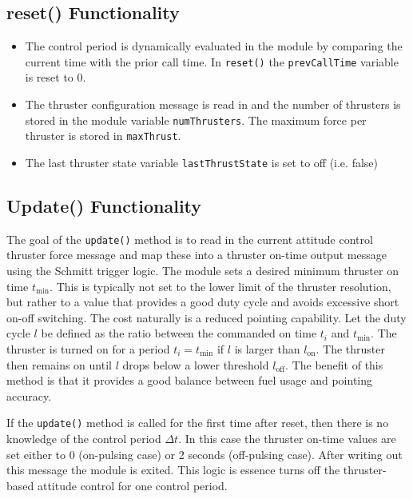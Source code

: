 \subsection{reset() Functionality}
\begin{itemize}
	\item The control period is dynamically evaluated in the module by comparing the current time with the prior call time.  In {\tt reset()} the {\tt prevCallTime} variable is reset to 0.
	\item The thruster configuration message is read in and the number of thrusters is stored in the module variable {\tt numThrusters}.  The maximum force per thruster is stored in {\tt maxThrust}.
	\item The last thruster state variable {\tt lastThrustState} is set to off (i.e. false)
\end{itemize}

\subsection{Update() Functionality}
The goal of the {\tt update()} method is to read in the current attitude control thruster force message and map these into a thruster on-time output message using the Schmitt trigger logic.\cite{Alcorn:2016rz}  The module sets a desired minimum thruster on time $t_{\text{min}}$.  This is typically not set to the lower limit of the thruster resolution, but rather to a value that provides a good duty cycle and avoids excessive short on-off switching.   The cost naturally is a reduced pointing capability.  Let the duty cycle $l$ be defined as the ratio between the commanded on time $t_{i}$ and $t_{\text{min}}$.  The thruster is turned on for a period $t_{i} = t_{\text{min}}$ if $l$ is larger than  $l_{\text{on}}$.  The thruster then remains on until $l$ drops below a lower threshold $l_{\text{off}}$.  The benefit of this method is that it provides a good balance between fuel usage and pointing accuracy.\cite{Alcorn:2016rz}


If the {\tt update()} method is called for the first time after reset, then there is no knowledge of the control period $\Delta t$.  In this case the thruster on-time values are set either to 0 (on-pulsing case) or 2 seconds (off-pulsing case).  After writing out this message the module is exited.  This logic is essence turns off the thruster-based attitude control for one control period.

